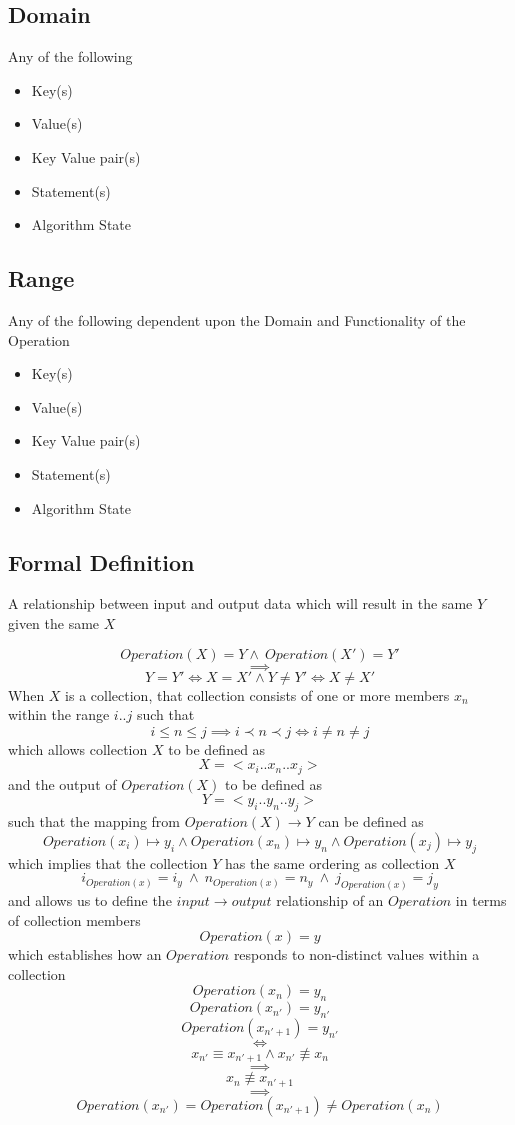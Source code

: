 \documentclass[../main.tex]{subfiles}
\begin{document}
\subsection{Domain}

Any of the following
\begin{itemize}
\item Key(s)
\item Value(s)
\item Key Value pair(s)
\item Statement(s)
\item Algorithm State
\end{itemize}

\subsection{Range}

Any of the following dependent upon the Domain and Functionality of the Operation

\begin{itemize}
\item Key(s)
\item Value(s)
\item Key Value pair(s)
\item Statement(s)
\item Algorithm State
\end{itemize}

\subsection{Formal Definition}

A relationship between input and output data which will result in the same $Y$ given the same $X$

$$Operation(X) = Y \land \ Operation(X') = Y'$$
$$\implies$$
$$Y = Y' \iff X = X'  \land Y \not= Y' \iff X \not= X'$$
When $X$ is a collection, that collection consists of one or more members $x_{n}$ within the range $i..j$ such that
$$i \leq n \leq j  \implies i \prec n \prec j \iff i \not= n \not= j$$
which allows collection $X$ to be defined as
$$X = <x_{i}..x_{n}..x_{j}> $$
and the output of $Operation(X)$ to be defined as
$$Y = <y_{i}..y_{n}..y_{j}>$$
such that the mapping from $Operation(X) \to Y$ can be defined as
$$Operation(x_{i}) \mapsto y_{i} \land Operation(x_{n}) \mapsto y_{n} \land Operation(x_{j}) \mapsto y_{j}$$
which implies that the collection $Y$ has the same ordering as collection $X$
$$ i_{Operation(x)} = i_{y} \ \land \ n_{Operation(x)} = n_{y} \ \land \ j_{Operation(x)} = j_{y} $$
and allows us to define the $input \to output$ relationship of an $Operation$ in terms of collection members
$$Operation(x) = y$$
which establishes how an $Operation$ responds to non-distinct values within a collection
$$Operation(x_{n}) = y_{n}$$
$$Operation(x_{n'}) = y_{n'}$$
$$Operation(x_{n' + 1}) = y_{n'}$$
$$\iff$$
$$x_{n'} \equiv x_{n'+1} \land x_{n'} \not \equiv x_{n}$$
$$\implies $$
$$x_{n} \not \equiv  x_{n' + 1}$$
$$\implies $$
$$Operation(x_{n'}) = Operation(x_{n' + 1}) \not= Operation(x_{n})$$
\end{document}
